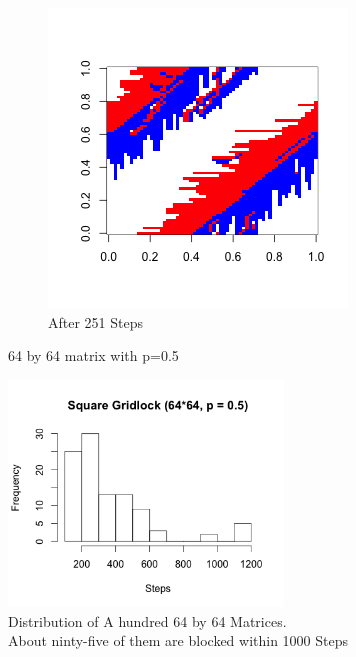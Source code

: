 \documentclass{article}
\begin{document}
\begin{figure}
\begin{subfigure}[b]{0.3\textwidth}
                \includegraphics[width=\textwidth]{example002}
                \caption{After 251 Steps}
        \end{subfigure}
        \caption{64 by 64 matrix with p=0.5}
\end{figure}


\begin{figure}[h]
\begin{center}
\includegraphics[width=0.65\textwidth]{gridlockhist} 
\caption{Distribution of A hundred 64 by 64 Matrices. \\
About ninty-five of them are blocked within 1000 Steps}
\end{center}
\end{figure}
\end{document}

